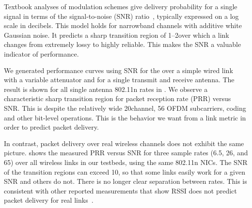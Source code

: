 Textbook analyses of modulation schemes give delivery probability for a single signal in terms of the signal-to-noise (SNR) ratio~\cite{Goldsmith}, %
typically expressed on a log scale in decibels.
This model holds for narrowband channels with additive white Gaussian noise. It predicts a sharp transition region of 1--2\dB over which a link changes from extremely lossy to highly reliable. This makes the SNR a valuable indicator of performance.

We generated performance curves using SNR for the  over a simple wired link with a variable attenuator and for a single transmit and receive antenna. The result is shown for all single antenna 802.11n rates in . 
We observe a characteristic sharp transition region for packet reception rate (PRR) versus SNR\@. This is despite the relatively wide 20\MHz channel, 56 OFDM subcarriers, coding and other bit-level operations. This is the behavior we want from a link metric in order to predict packet delivery.

In contrast, packet delivery over real wireless channels does not exhibit the same picture.  shows the measured PRR versus SNR for three sample rates (6.5, 26, and 65\Mbps) over all wireless links in our testbeds, using the same 802.11n NICs. The SNR of the transition regions can exceed 10\dB, so that some links easily work for a given SNR and others do not. There is no longer clear separation between rates. This is consistent with other reported measurements that show RSSI does not predict packet delivery for real links~\cite{aguayo_roofnet, Reis_sigcomm06, snr_infocom08, zhao_sensys03}.

